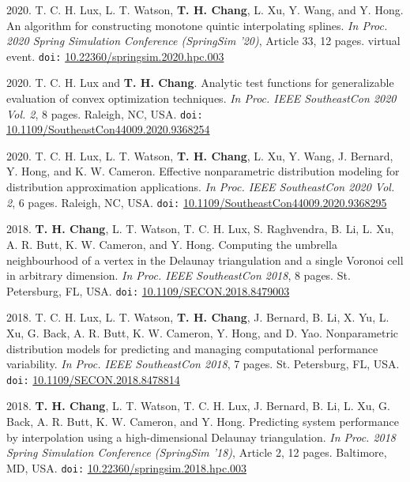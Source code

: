 \documentclass[10pt]{article}
\begin{document}
\medskip

2020. T. C. H. Lux, L. T. Watson, {\bf T. H. Chang}, L. Xu, Y. Wang, and Y. Hong. An algorithm for constructing monotone quintic interpolating splines. {\sl In Proc. 2020 Spring Simulation Conference (SpringSim '20)}, Article 33, 12 pages. virtual event. {\tt doi:} \href{https://doi.org/10.22360/springsim.2020.hpc.003}{10.22360/springsim.2020.hpc.003}

\medskip

2020. T. C. H. Lux and {\bf T. H. Chang}. Analytic test functions for generalizable evaluation of convex optimization techniques. {\sl In Proc. IEEE SoutheastCon 2020 Vol. 2}, 8 pages. Raleigh, NC, USA. {\tt doi:} \href{https://doi.org/10.1109/SoutheastCon44009.2020.9368254}{10.1109/SoutheastCon44009.2020.9368254}

\medskip

2020. T. C. H. Lux, L. T. Watson, {\bf T. H. Chang}, L. Xu, Y. Wang, J. Bernard, Y. Hong, and K. W. Cameron. Effective nonparametric distribution modeling for distribution approximation applications. {\sl In Proc. IEEE SoutheastCon 2020 Vol. 2}, 6 pages. Raleigh, NC, USA. {\tt doi:} \href{https://doi.org/10.1109/SoutheastCon44009.2020.9368295}{10.1109/SoutheastCon44009.2020.9368295}

\medskip

2018. {\bf T. H. Chang}, L. T. Watson, T. C. H. Lux, S. Raghvendra, B. Li, L. Xu, A. R. Butt, K. W. Cameron, and Y. Hong. Computing the umbrella neighbourhood of a vertex in the Delaunay triangulation and a single Voronoi cell in arbitrary dimension. {\sl In Proc. IEEE SoutheastCon 2018}, 8 pages. St. Petersburg, FL, USA. {\tt doi:} \href{https://doi.org/10.1109/SECON.2018.8479003}{10.1109/SECON.2018.8479003}

\medskip

2018. T. C. H. Lux, L. T. Watson, {\bf T. H. Chang}, J. Bernard, B. Li, X. Yu, L. Xu, G. Back, A. R. Butt, K. W. Cameron, Y. Hong, and D. Yao. Nonparametric distribution models for predicting and managing computational performance variability. {\sl In Proc. IEEE SoutheastCon 2018}, 7 pages. St. Petersburg, FL, USA. {\tt doi:} \href{https://doi.org/10.1109/SECON.2018.8478814}{10.1109/SECON.2018.8478814}

\medskip

2018. {\bf T. H. Chang}, L. T. Watson, T. C. H. Lux, J. Bernard, B. Li, L. Xu, G. Back, A. R. Butt, K. W. Cameron, and Y. Hong. Predicting system performance by interpolation using a high-dimensional Delaunay triangulation. {\sl In Proc. 2018 Spring Simulation Conference (SpringSim '18)}, Article 2, 12 pages. Baltimore, MD, USA. {\tt doi:} \href{https://doi.org/10.22360/springsim.2018.hpc.003}{10.22360/springsim.2018.hpc.003}
\end{document}
